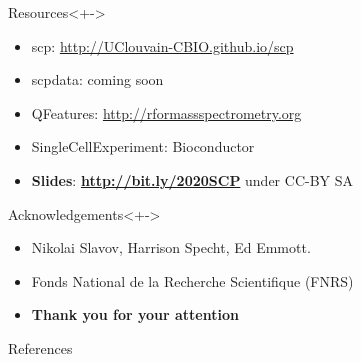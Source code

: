 \documentclass{beamer}
\newcommand{\hcode}[2][lgray]{{\ttfamily\color{vdgray}\colorbox{#1}{#2}}}
\begin{document}
\begin{frame}

  \begin{block}{Resources}<+->
    \begin{itemize}
        \item \hcode{scp}: \url{http://UClouvain-CBIO.github.io/scp}
        \item \hcode{scpdata}: coming soon
        \item \hcode{QFeatures}: \url{http://rformassspectrometry.org}
        \item \hcode{SingleCellExperiment}: Bioconductor
        \item \textbf{Slides}: \textbf{\url{http://bit.ly/2020SCP}} under CC-BY SA
    \end{itemize}
  \end{block}

  \bigskip

  \begin{block}{Acknowledgements}<+->
    \begin{itemize}
    \item Nikolai Slavov, Harrison Specht, Ed Emmott.
    \item Fonds National de la Recherche Scientifique (FNRS)
    \item \textbf{Thank you for your attention}
    \end{itemize}
  \end{block}

\end{frame}



\begin{frame}[allowframebreaks]{References}
  \scriptsize
  
  
\end{frame}
\end{document}
